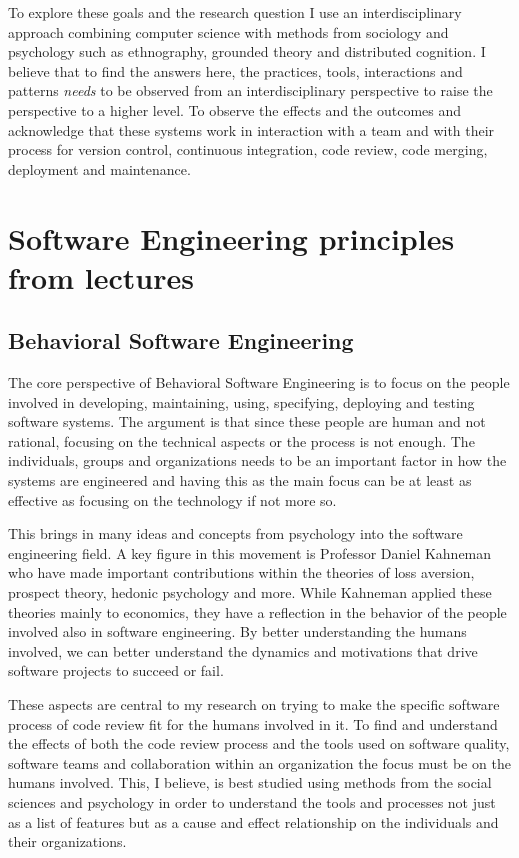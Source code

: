 \documentclass[a4paper,twocolumn]{article}
\begin{document}
To explore these goals and the research question I use an interdisciplinary
approach combining computer science with methods from sociology and psychology
such as ethnography\cite{h_sharp_role_2016}, grounded
theory\cite{adolph_using_2011} and distributed
cognition\cite{hutchins1995cognition}. I believe that to find the answers here,
the practices, tools, interactions and patterns \emph{needs} to be observed from
an interdisciplinary perspective to raise the perspective to a higher level. To
observe the effects and the outcomes and acknowledge that these systems work in
interaction with a team and with their process for version control, continuous
integration, code review, code merging, deployment and maintenance. 

\section{Software Engineering principles from lectures}

\subsection{Behavioral Software Engineering}

The core perspective of Behavioral Software Engineering is to focus on the
people involved in developing, maintaining, using, specifying, deploying and
testing software systems. The argument is that since these people are human and
not rational, focusing on the technical aspects or the process is not enough.
The individuals, groups and organizations needs to be an important factor in how
the systems are engineered and having this as the main focus can be at least as
effective as focusing on the technology if not more so.

This brings in many ideas and concepts from psychology into the software
engineering field. A key figure in this movement is Professor Daniel Kahneman
who have made important contributions within the theories of loss aversion,
prospect theory, hedonic psychology and more. While Kahneman applied these
theories mainly to economics, they have a reflection in the behavior of the
people involved also in software engineering. By better understanding the humans
involved, we can better understand the dynamics and motivations that drive
software projects to succeed or fail.

These aspects are central to my research on trying to make the specific software
process of code review fit for the humans involved in it. To find and understand
the effects of both the code review process and the tools used on software
quality, software teams and collaboration within an organization the focus must
be on the humans involved. This, I believe, is best studied using methods from
the social sciences and psychology in order to understand the tools and
processes not just as a list of features but as a cause and effect relationship
on the individuals and their organizations.
\end{document}
